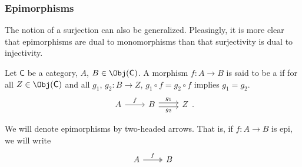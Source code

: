 \documentclass[main.tex]{subfiles}
\begin{document}
\subsubsection{Epimorphisms}

The notion of a surjection can also be generalized. Pleasingly, it is more clear that epimorphisms are dual to monomorphisms than that surjectivity is dual to injectivity.

\begin{definition}[epimorphism]
  \label{def:epimorphism}
  Let $\mathsf{C}$ be a category, $A$, $B\in \Obj(\mathsf{C})$. A morphism $f\colon A \to B$ is said to be a  if for all $Z \in \Obj(\mathsf{C})$ and all $g_{1}$, $g_{2}\colon B \to Z$, $g_{1} \circ f = g_{2}\circ f$ implies $g_{1} = g_{2}$.
  \begin{equation*}
    \begin{tikzcd}
      A \arrow[r, "f"] & B \arrow[r, shift left, "g_{1}"] \arrow[r, shift right, swap, "g_{2}"] & Z
    \end{tikzcd}.
  \end{equation*}
\end{definition}

\begin{notation}
  We will denote epimorphisms by two-headed arrows. That is, if $f\colon A \to B$ is epi, we will write
  \begin{equation*}
    \begin{tikzcd}
      A
      \arrow[r, twoheadrightarrow, "f"]
      & B
    \end{tikzcd}
  \end{equation*}
\end{notation}
\end{document}
